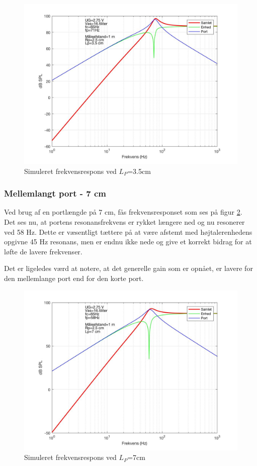 \begin{figure}[h!]
	\centering
	\includegraphics[width=.8\textwidth]{Pics/sim_kort}
	\caption{Simuleret frekvensrespons ved $L_P$=3.5cm } 
	\label{fig:sim_kort}
\end{figure}

\subsubsection{Mellemlangt port - 7 cm}

Ved brug af en portlængde på 7 cm, fås frekvensresponset som ses på figur \ref{fig:sim_medium}. \\
Det ses nu, at portens resonansfrekvens er rykket længere ned og nu resonerer ved 58 Hz. Dette er væsentligt tættere på at være afstemt med højtalerenhedens opgivne 45 Hz resonans, men er endnu ikke nede og give et korrekt bidrag for at løfte de lavere frekvenser. 

Det er ligeledes værd at notere, at det generelle gain som er opnået, er lavere for den mellemlange port end for den korte port.  

\begin{figure}[h!]
	\centering
	\includegraphics[width=.8\textwidth]{Pics/sim_medium}
	\caption{Simuleret frekvensrespons ved $L_P$=7cm } 
	\label{fig:sim_medium}
\end{figure}

